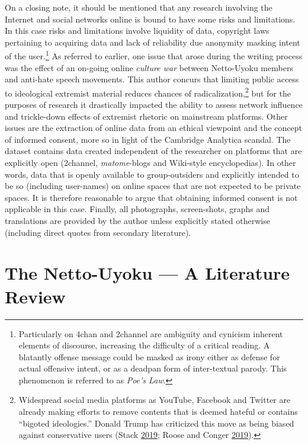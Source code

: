 \documentclass[10pt,british,A4paper,twoside]{memoir}
\begin{document}
On a closing note, it should be mentioned that any research involving
the Internet and social networks online is bound to have some risks and
limitations. In this case risks and limitations involve liquidity of
data, copyright laws pertaining to acquiring data and lack of
reliability due anonymity masking intent of the user.\footnote{Particularly
  on 4chan and 2channel are ambiguity and cynicism inherent elements of
  discourse, increasing the difficulty of a critical reading. A
  blatantly offense message could be masked as irony either as defense
  for actual offensive intent, or as a deadpan form of inter-textual
  parody. This phenomenon is referred to as \emph{Poe's Law}.} As
referred to earlier, one issue that arose during the writing process was
the effect of an on-going online \emph{culture war} between Netto-Uyoku
members and anti-hate speech movements. This author concurs that
limiting public access to ideological extremist material reduces chances
of radicalization,\footnote{Widespread social media platforms as
  YouTube, Facebook and Twitter are already making efforts to remove
  contents that is deemed hateful or contains ``bigoted ideologies.''
  Donald Trump has criticized this move as being biased against
  conservative users (Stack
  \protect\hyperlink{ref-stack_trump_2019}{2019}; Roose and Conger
  \protect\hyperlink{ref-roose_youtube_2019}{2019}).} but for the
purposes of research it drastically impacted the ability to assess
network influence and trickle-down effects of extremist rhetoric on
mainstream platforms. Other issues are the extraction of online data
from an ethical viewpoint and the concept of informed consent, more so
in light of the Cambridge Analytica scandal. The dataset contains data
created independent of the researcher on platforms that are explicitly
open (2channel, \emph{matome}-blogs and Wiki-style encyclopedias). In
other words, data that is openly available to group-outsiders and
explicitly intended to be so (including user-names) on online spaces
that are not expected to be private spaces. It is therefore reasonable
to argue that obtaining informed consent is not applicable in this case.
Finally, all photographs, screen-shots, graphs and translations are
provided by the author unless explicitly stated otherwise (including
direct quotes from secondary literature).

\newpage

\chapter{The Netto-Uyoku --- A Literature
Review}\label{the-netto-uyoku-a-literature-review}
\end{document}
